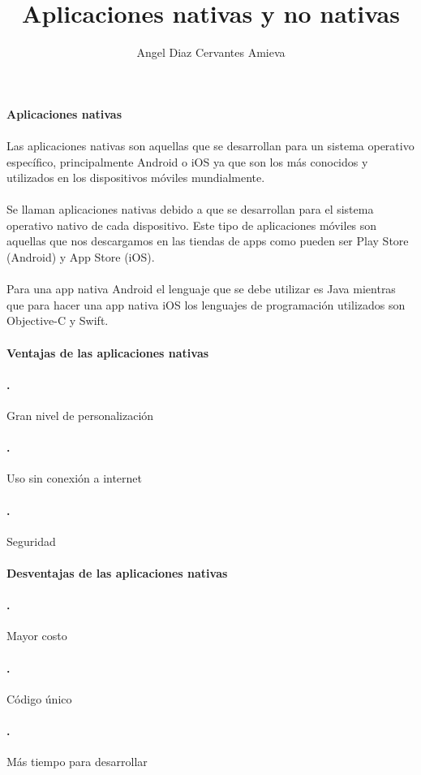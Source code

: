 \documentclass[12pt,a4paper]{article}
\author{Angel Diaz Cervantes Amieva}
\title{Aplicaciones nativas y no nativas}
\begin{document}
\paragraph{Aplicaciones nativas}
\paragraph{}
Las aplicaciones nativas son aquellas que se desarrollan para un sistema operativo específico, principalmente Android o iOS ya que son los más conocidos y utilizados en los dispositivos móviles mundialmente.
\\
\\
Se llaman aplicaciones nativas debido a que se desarrollan para el sistema operativo nativo de cada dispositivo. Este tipo de aplicaciones móviles son aquellas que nos descargamos en las tiendas de apps como pueden ser Play Store (Android) y App Store (iOS).
\\
\\
Para una app nativa Android el lenguaje que se debe utilizar es Java mientras que para hacer una app nativa iOS los lenguajes de programación utilizados son Objective-C y Swift.
\paragraph{Ventajas de las aplicaciones nativas}
\paragraph{.}
Gran nivel de personalización
\paragraph{.}
Uso sin conexión a internet
\paragraph{.}
Seguridad
\paragraph{Desventajas de las aplicaciones nativas}
\paragraph{.}
Mayor costo
\paragraph{.}
Código único
\paragraph{.}
Más tiempo para desarrollar
\end{document}
